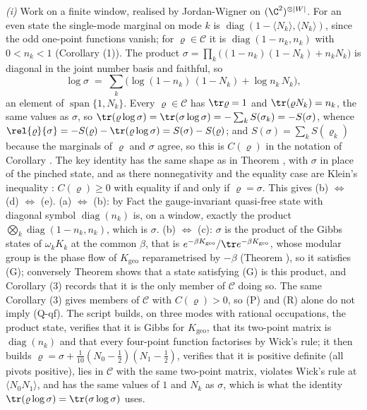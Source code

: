 \emph{(i)} Work on a finite window, realised by Jordan-Wigner on $(\C^{2})^{\otimes |W|}$. For an even state the single-mode marginal on mode $k$ is $\operatorname{diag}(1 - \langle N_{k}\rangle, \langle N_{k}\rangle)$, since the odd one-point functions vanish; for $\varrho \in \mathcal{C}$ it is $\operatorname{diag}(1 - n_{k}, n_{k})$ with $0 < n_{k} < 1$ (Corollary (1)). The product $\sigma = \prod_{k}\bigl((1 - n_{k})(1 - N_{k}) + n_{k}N_{k}\bigr)$ is diagonal in the joint number basis and faithful, so
\[
\log\sigma \;=\; \sum_{k}\bigl(\log(1 - n_{k})\,(1 - N_{k}) + \log n_{k}\,N_{k}\bigr),
\]
an element of $\operatorname{span}\{1, N_{k}\}$. Every $\varrho \in \mathcal{C}$ has $\tr\varrho = 1$ and $\tr(\varrho N_{k}) = n_{k}$, the same values as $\sigma$, so $\tr(\varrho\log\sigma) = \tr(\sigma\log\sigma) = -\sum_{k}S(\sigma_{k}) = -S(\sigma)$, whence $\rel{\varrho}{\sigma} = -S(\varrho) - \tr(\varrho\log\sigma) = S(\sigma) - S(\varrho)$; and $S(\sigma) = \sum_{k}S(\varrho_{k})$ because the marginals of $\varrho$ and $\sigma$ agree, so this is $C(\varrho)$ in the notation of Corollary . The key identity has the same shape as in Theorem , with $\sigma$ in place of the pinched state, and as there nonnegativity and the equality case are Klein's inequality \cite[\S 11.3]{NielsenChuang}: $C(\varrho) \geq 0$ with equality if and only if $\varrho = \sigma$. This gives (b) $\Leftrightarrow$ (d) $\Leftrightarrow$ (e). (a) $\Leftrightarrow$ (b): by Fact  the gauge-invariant quasi-free state with diagonal symbol $\operatorname{diag}(n_{k})$ is, on a window, exactly the product $\bigotimes_{k}\operatorname{diag}(1 - n_{k}, n_{k})$, which is $\sigma$. (b) $\Leftrightarrow$ (c): $\sigma$ is the product of the Gibbs states of $\omega_{k}K_{k}$ at the common $\beta$, that is $e^{-\beta K_{\mathrm{geo}}}/\tr e^{-\beta K_{\mathrm{geo}}}$, whose modular group is the phase flow of $K_{\mathrm{geo}}$ reparametrised by $-\beta$ (Theorem ), so it satisfies (G); conversely Theorem  shows that a state satisfying (G) is this product, and Corollary (3) records that it is the only member of $\mathcal{C}$ doing so. The same Corollary (3) gives members of $\mathcal{C}$ with $C(\varrho) > 0$, so (P) and (R) alone do not imply (Q-qf). The script builds, on three modes with rational occupations, the product state, verifies that it is Gibbs for $K_{\mathrm{geo}}$, that its two-point matrix is $\operatorname{diag}(n_{k})$ and that every four-point function factorises by Wick's rule; it then builds $\varrho = \sigma + \tfrac{1}{10}(N_{0} - \tfrac12)(N_{1} - \tfrac12)$, verifies that it is positive definite (all pivots positive), lies in $\mathcal{C}$ with the same two-point matrix, violates Wick's rule at $\langle N_{0}N_{1}\rangle$, and has the same values of $1$ and $N_{k}$ as $\sigma$, which is what the identity $\tr(\varrho\log\sigma) = \tr(\sigma\log\sigma)$ uses.


